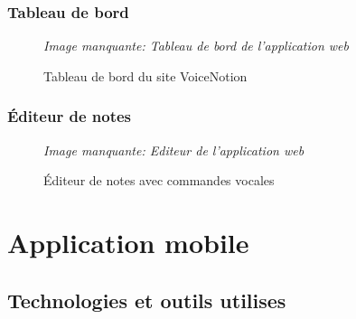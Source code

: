 \subsubsection{Tableau de bord}
\begin{figure}[H]
\centering
\textit{Image manquante: Tableau de bord de l'application web}
\caption{Tableau de bord du site VoiceNotion}
\label{fig:web-dashboard}
\end{figure}

\subsubsection{Éditeur de notes}
\begin{figure}[H]
\centering
\textit{Image manquante: Editeur de l'application web}
\caption{Éditeur de notes avec commandes vocales}
\label{fig:web-editor}
\end{figure}

\section{Application mobile}
\subsection{Technologies et outils utilises}


